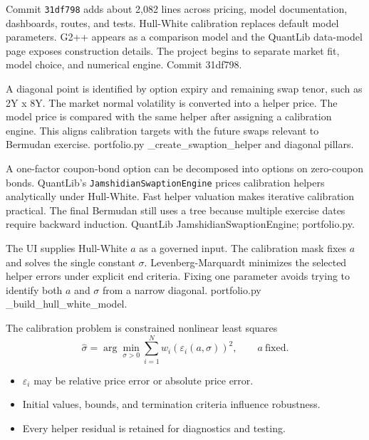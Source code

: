 
{Commit \texttt{31df798} adds about 2,082 lines across pricing, model documentation, dashboards, routes, and tests.}
{Hull-White calibration replaces default model parameters.}
{G2++ appears as a comparison model and the QuantLib data-model page exposes construction details.}
{The project begins to separate market fit, model choice, and numerical engine.}
{Commit 31df798.}

{A diagonal point is identified by option expiry and remaining swap tenor, such as 2Y x 8Y.}
{The market normal volatility is converted into a helper price.}
{The model price is compared with the same helper after assigning a calibration engine.}
{This aligns calibration targets with the future swaps relevant to Bermudan exercise.}
{portfolio.py \_create\_swaption\_helper and diagonal pillars.}

{A one-factor coupon-bond option can be decomposed into options on zero-coupon bonds.}
{QuantLib's \texttt{JamshidianSwaptionEngine} prices calibration helpers analytically under Hull-White.}
{Fast helper valuation makes iterative calibration practical.}
{The final Bermudan still uses a tree because multiple exercise dates require backward induction.}
{QuantLib JamshidianSwaptionEngine; portfolio.py.}

{The UI supplies Hull-White $a$ as a governed input.}
{The calibration mask fixes $a$ and solves the single constant $\sigma$.}
{Levenberg-Marquardt minimizes the selected helper errors under explicit end criteria.}
{Fixing one parameter avoids trying to identify both $a$ and $\sigma$ from a narrow diagonal.}
{portfolio.py \_build\_hull\_white\_model.}

\begin{frame}{The calibration problem is constrained nonlinear least squares}
  \[
    \widehat\sigma=\arg\min_{\sigma>0}
    \sum_{i=1}^{N} w_i\left(\varepsilon_i(a,\sigma)\right)^2,
    \qquad a\ \text{fixed}.
  \]
  \begin{itemize}\setlength\itemsep{0.8em}
    \item $\varepsilon_i$ may be relative price error or absolute price error.
    \item Initial values, bounds, and termination criteria influence robustness.
    \item Every helper residual is retained for diagnostics and testing.
  \end{itemize}
\end{frame}

